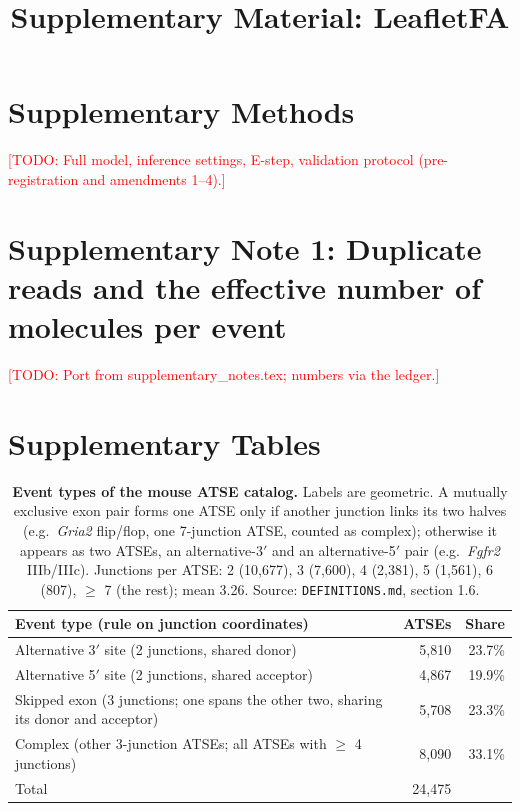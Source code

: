\documentclass[webpdf,traditional,large,namedate]{oup-authoring-template}
\newcommand{\todo}[1]{\textcolor{red}{[TODO: #1]}}
\begin{document}
\title[LeafletFA]{Supplementary Material: LeafletFA}
\maketitle

\section*{Supplementary Methods}
\todo{Full model, inference settings, E-step, validation protocol (pre-registration and amendments 1--4).}

\section*{Supplementary Note 1: Duplicate reads and the effective number of molecules per event}
\label{suppnote:duplicates}
\todo{Port from supplementary\_notes.tex; numbers via the ledger.}

\section*{Supplementary Tables}
\begin{table}[H]
\centering\small
\begin{tabular}{lrr}
\toprule
Event type (rule on junction coordinates) & ATSEs & Share \\
\midrule
Alternative 3$'$ site (2 junctions, shared donor) & 5,810 & 23.7\% \\
Alternative 5$'$ site (2 junctions, shared acceptor) & 4,867 & 19.9\% \\
Skipped exon (3 junctions; one spans the other two, sharing its donor and acceptor) & 5,708 & 23.3\% \\
Complex (other 3-junction ATSEs; all ATSEs with $\geq$ 4 junctions) & 8,090 & 33.1\% \\
\midrule
Total & 24,475 & \\
\bottomrule
\end{tabular}
\caption{\textbf{Event types of the mouse ATSE catalog.} Labels are geometric. A mutually exclusive exon pair forms one ATSE only if another junction links its
two halves (e.g.\ \textit{Gria2} flip/flop, one 7-junction ATSE, counted as complex); otherwise it appears as two ATSEs,
an alternative-3$'$ and an alternative-5$'$ pair (e.g.\ \textit{Fgfr2} IIIb/IIIc). Junctions per ATSE: 2 (10,677), 3 (7,600), 4 (2,381), 5 (1,561), 6 (807), $\geq$ 7 (the rest);
mean 3.26. Source: \texttt{DEFINITIONS.md}, section 1.6.}
\label{tab:eventtypes}
\end{table}
\end{document}
